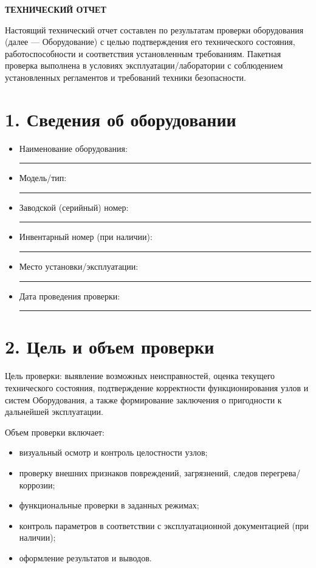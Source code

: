 \documentclass[12pt]{article}
\begin{document}
\begin{center}
\textbf{\LARGE ТЕХНИЧЕСКИЙ ОТЧЕТ}
\end{center}

\vspace{1cm}

\noindent Настоящий технический отчет составлен по результатам проверки оборудования (далее --- Оборудование) с целью подтверждения его технического состояния, работоспособности и соответствия установленным требованиям. Пакетная проверка выполнена в условиях эксплуатации/лаборатории с соблюдением установленных регламентов и требований техники безопасности.

\vspace{0.5cm}

\section*{1. Сведения об оборудовании}
\begin{itemize}
    \item Наименование оборудования: \rule{0.75\linewidth}{0.4pt}
    \item Модель/тип: \rule{0.75\linewidth}{0.4pt}
    \item Заводской (серийный) номер: \rule{0.75\linewidth}{0.4pt}
    \item Инвентарный номер (при наличии): \rule{0.75\linewidth}{0.4pt}
    \item Место установки/эксплуатации: \rule{0.75\linewidth}{0.4pt}
    \item Дата проведения проверки: \rule{0.75\linewidth}{0.4pt}
\end{itemize}

\vspace{0.5cm}

\section*{2. Цель и объем проверки}
\noindent Цель проверки: выявление возможных неисправностей, оценка текущего технического состояния, подтверждение корректности функционирования узлов и систем Оборудования, а также формирование заключения о пригодности к дальнейшей эксплуатации.

\noindent Объем проверки включает:
\begin{itemize}
    \item визуальный осмотр и контроль целостности узлов;
    \item проверку внешних признаков повреждений, загрязнений, следов перегрева/коррозии;
    \item функциональные проверки в заданных режимах;
    \item контроль параметров в соответствии с эксплуатационной документацией (при наличии);
    \item оформление результатов и выводов.
\end{itemize}
\end{document}
